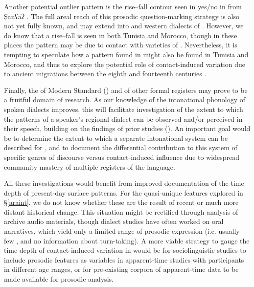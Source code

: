 \documentclass[output=paper]{langsci/langscibook}
\begin{document}
Another potential outlier pattern is the rise--fall  contour seen in yes/no  in  from Ṣanʕāʔ \citep{Hellmuth2014}. The full areal reach of this prosodic question-marking strategy is also not yet fully known, and may extend into   and western dialects of . However, we do know that a rise--fall is seen in both Tunisia and Morocco, though in these places the pattern may be due to contact with varieties of . Nevertheless, it is tempting to speculate how a pattern found in  might also be found in Tunisia and Morocco, and thus to explore the potential role of contact-induced variation due to ancient migrations between the eighth and fourteenth centuries \citep{Holes2018}.

Finally, the  of Modern Standard  ({}) and of other formal registers may prove to be a fruitful domain of  research. As our knowledge of the intonational phonology of spoken  dialects improves, this will facilitate investigation of the extent to which the  patterns of a speaker’s regional dialect can be observed and/or perceived in their {} speech, building on the findings of prior studies (\citealt{ElZarkaHellmuth2009}). An important goal would be to determine the extent to which a separate intonational system can be described for , and to document the differential contribution to this system of specific genres of  discourse versus contact-induced influence due to widespread community mastery of multiple registers of the language.  

All these investigations would benefit from improved documentation of the time depth of present-day surface  patterns. For the quasi-unique features explored in §\ref{araint}, we do not know whether these are the result of recent or much more distant historical change. This situation might be rectified through analysis of archive audio materials, though dialect studies have often worked on oral narratives, which yield only a limited range of prosodic expression (i.e. usually few , and no information about turn-taking). A more viable strategy to gauge the time depth of contact-induced variation in   would be for  sociolinguistic studies to include prosodic features as variables in apparent-time studies with participants in different age ranges, or for pre-existing corpora of apparent-time data to be made available for prosodic analysis.
\end{document}
